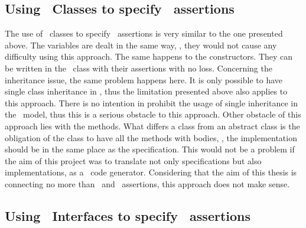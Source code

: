\subsection{Using \java\ Classes to specify \jml\ assertions}

The use of \java\ classes to specify \jml\ assertions is very similar to the one presented above. The variables are dealt in the same way, \ie, they would not cause any difficulty using this approach. 
The same happens to the constructors. They can be written in the \java\ class with their assertions with no loss. 
Concerning the inheritance issue, the same problem happens here. It is only possible to have single class inheritance in \java, thus the limitation presented above also applies to this approach. There is no intention in prohibit the usage of single inheritance in the \vpp\ model, thus this is a serious obstacle to this approach.
Other obstacle of this approach lies with the methods. What differs a class from an abstract class is the obligation of the class to have all the methods with bodies, \ie, the implementation should be in the same place as the specification.
This would not be a problem if the aim of this project was to translate not only specifications but also implementations, as a \java\ code generator. Considering that the aim of this thesis is connecting no more than \vpp\ and \jml\ assertions, this approach does not make sense. 

\subsection{Using \java\ Interfaces to specify \jml\ assertions}

